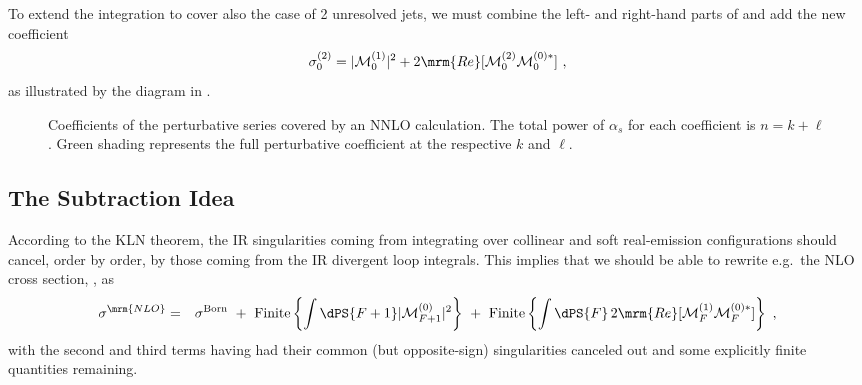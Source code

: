 %
To extend the integration to cover also the case of 2 unresolved jets,
we must combine the left- and right-hand parts of
 and add the new coefficient
\begin{equation}
\sigma_0^{(2)} = |{\cal M}_0^{(1)}|^2 + 2\mrm{Re}[ {\cal
    M}_0^{(2)}{\cal M}_0^{(0)*} ]~,
\end{equation}
 as illustrated by the diagram in . 
\begin{figure}[t]
\begin{center}
\caption{Coefficients of the perturbative series covered by an NNLO
  calculation. 
  The total power of $\alpha_s$ for each coefficient is $n =
  k+\ell$. Green  shading represents the full perturbative 
  coefficient at the respective $k$ and $\ell$.
\label{fig:loopsnlegs3}}
\end{center}
\end{figure}

\subsection{The Subtraction Idea \label{sec:subtraction}}
According to the KLN theorem, the IR singularities coming from
integrating over collinear and soft real-emission configurations
should cancel, order by order, by those coming from the IR divergent
loop integrals. This implies that we should be able to rewrite e.g.\
the NLO cross section, , as 
\begin{eqnarray}
\displaystyle\sigma^\mrm{NLO} 
 & = &\displaystyle \sigma^\mathrm{Born}
\ + \ \mathrm{Finite}\left\{\int \dPS{F+1} |{\cal M}^{(0)}_{F+1}|^2\right\}
\ + \ 
\mathrm{Finite}\left\{\int \dPS{F} \, 2\mrm{Re}[{\cal M}_{F}^{(1)} {\cal M}_{F}^{(0)*}]\right\} 
\displaystyle ~,
\end{eqnarray}
with the second and third terms having had their common (but
opposite-sign) singularities canceled out and some explicitly finite
quantities remaining. 

